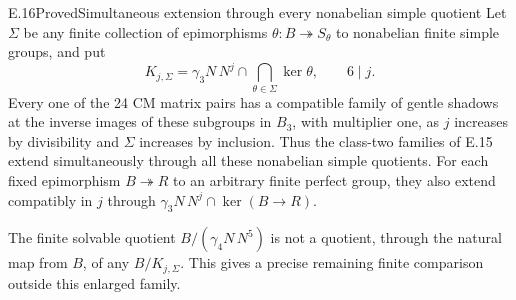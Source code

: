 \begin{statement}{E.16}{Proved}{Simultaneous extension through every nonabelian simple quotient}
Let $\Sigma$ be any finite collection of epimorphisms
$\theta:B\twoheadrightarrow S_\theta$ to nonabelian finite
simple groups, and put
\[
 K_{j,\Sigma}=\gamma_3N\,N^j\cap
                \bigcap_{\theta\in\Sigma}\ker\theta,
 \qquad 6\mid j.
 \tag{E.16.1}
\]
Every one of the 24 CM matrix pairs has a compatible family
of gentle shadows at the inverse images of these subgroups
in $B_3$, with multiplier one, as $j$ increases by
divisibility and $\Sigma$ increases by inclusion.
Thus the class-two families of E.15 extend simultaneously
through all these nonabelian simple quotients.
For each fixed epimorphism $B\twoheadrightarrow R$ to
an arbitrary finite perfect group, they also extend
compatibly in $j$ through
$\gamma_3N\,N^j\cap\ker(B\to R)$.

The finite solvable quotient
$B/(\gamma_4N\,N^5)$ is not a quotient, through the natural
map from $B$, of any $B/K_{j,\Sigma}$. This gives a precise
remaining finite comparison outside this enlarged family.
\end{statement}
